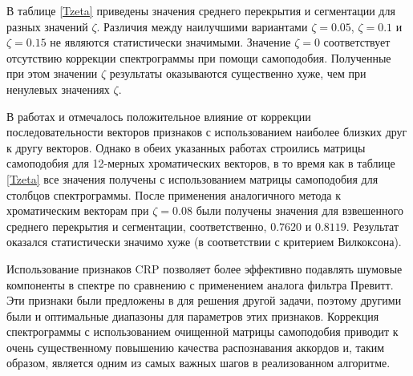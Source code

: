 В таблице \ref{Tzeta} приведены значения среднего перекрытия и сегментации для
разных значений $\zeta$. Различия между наилучшими вариантами $\zeta=0.05$,
$\zeta=0.1$ и $\zeta=0.15$ не являются статистически значимыми. Значение
$\zeta=0$ соответствует отсутствию коррекции спектрограммы при помощи
самоподобия. Полученные при этом значении $\zeta$ результаты оказываются
существенно хуже, чем при ненулевых значениях $\zeta$.

В работах \cite{Mauch2010} и \cite{Cho2011} отмечалось положительное влияние от
коррекции последовательности векторов признаков с использованием наиболее
близких друг к другу векторов. Однако в обеих указанных работах строились
матрицы самоподобия для 12-мерных хроматических векторов, в то время как в
таблице \ref{Tzeta} все значения получены с использованием матрицы самоподобия
для столбцов спектрограммы. После применения аналогичного метода к хроматическим
векторам при $\zeta=0.08$ были получены значения для взвешенного среднего
перекрытия и сегментации, соответственно, $0.7620$ и $0.8119$. Результат
оказался статистически значимо хуже (в соответствии с критерием Вилкоксона).

\medskip

Использование признаков CRP позволяет более эффективно подавлять шумовые
компоненты в спектре по сравнению с применением аналога фильтра Превитт. Эти
признаки были предложены в \cite{Mueller2009} для решения другой задачи, поэтому
другими были и оптимальные диапазоны для параметров этих признаков. Коррекция
спектрограммы с использованием очищенной матрицы самоподобия приводит к очень
существенному повышению качества распознавания аккордов и, таким образом,
является одним из самых важных шагов в реализованном алгоритме.


